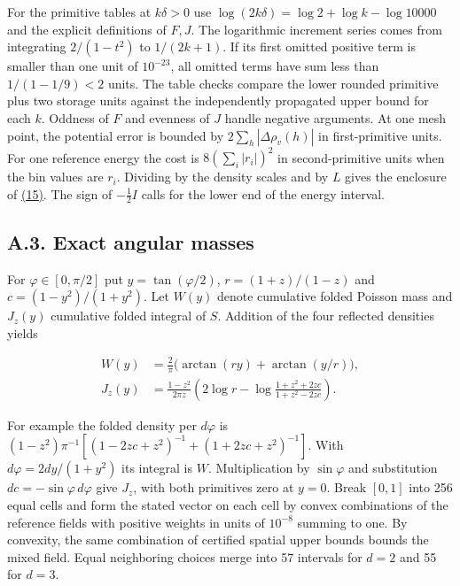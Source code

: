 \documentclass[11pt,a4paper]{article}
\begin{document}
For the primitive tables at \(k\delta>0\) use \(\log(2k\delta)=\log2+\log k-\log10000\) and the explicit definitions of \(F,J\). The logarithmic increment series comes from integrating \(2/(1-t^2)\) to \(1/(2k+1)\). If its first omitted positive term is smaller than one unit of \(10^{-23}\), all omitted terms have sum less than \(1/(1-1/9)<2\) units. The table checks compare the lower rounded primitive plus two storage units against the independently propagated upper bound for each \(k\). Oddness of \(F\) and evenness of \(J\) handle negative arguments. At one mesh point, the potential error is bounded by \(2\sum_h|\Delta\rho_v(h)|\) in first-primitive units. For one reference energy the cost is \(8(\sum_i|r_i|)^2\) in second-primitive units when the bin values are \(r_i\). Dividing by the density scales and by \(L\) gives the enclosure of \hyperref[eq:15]{(15)}. The sign of \(-\frac12 I\) calls for the lower end of the energy interval.

\subsection{A.3. Exact angular masses}\label{a.3.-exact-angular-masses}

For \(\varphi\in[0,\pi/2]\) put \(y=\tan(\varphi/2)\), \(r=(1+z)/(1-z)\) and \(c=(1-y^2)/(1+y^2)\). Let \(W(y)\) denote cumulative folded Poisson mass and \(J_z(y)\) cumulative folded integral of \(S\). Addition of the four reflected densities yields

\[
 \begin{aligned}
 W(y)&=\frac2\pi\big(\arctan(ry)+\arctan(y/r)\big),\\
 J_z(y)&=\frac{1-z^2}{2\pi z}\left(2\log r-
            \log\frac{1+z^2+2zc}{1+z^2-2zc}\right).
 \end{aligned}                                                            \tag{27}\label{eq:27}
\]

For example the folded density per \(d\varphi\) is \((1-z^2)\pi^{-1}[(1-2zc+z^2)^{-1}+(1+2zc+z^2)^{-1}]\). With \(d\varphi=2dy/(1+y^2)\) its integral is \(W\). Multiplication by \(\sin\varphi\) and substitution \(dc=-\sin\varphi\,d\varphi\) give \(J_z\), with both primitives zero at \(y=0\). Break \([0,1]\) into 256 equal cells and form the stated vector on each cell by convex combinations of the reference fields with positive weights in units of \(10^{-8}\) summing to one. By convexity, the same combination of certified spatial upper bounds bounds the mixed field. Equal neighboring choices merge into 57 intervals for \(d=2\) and 55 for \(d=3\).
\end{document}
